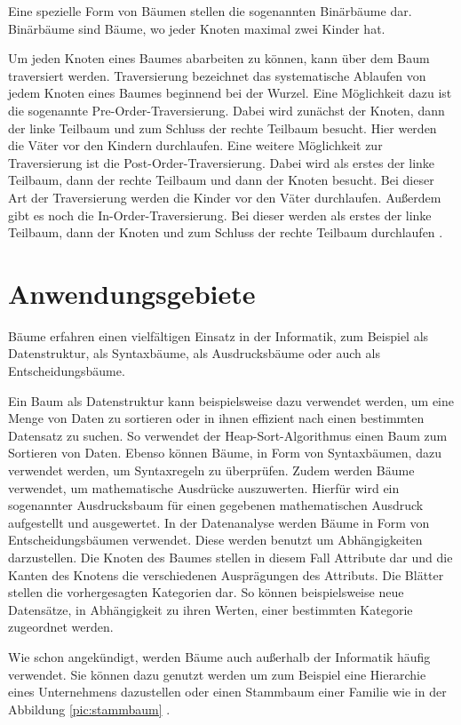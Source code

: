 Eine spezielle Form von Bäumen stellen die sogenannten Binärbäume dar. 
Binärbäume sind Bäume, wo jeder Knoten maximal zwei Kinder hat.

Um jeden Knoten eines Baumes abarbeiten zu können, kann über dem Baum 
traversiert werden. Traversierung bezeichnet das systematische Ablaufen 
von jedem Knoten eines Baumes beginnend bei der Wurzel. Eine Möglichkeit dazu ist die sogenannte
Pre-Order-Traversierung. Dabei wird zunächst der Knoten, dann der linke Teilbaum
und zum Schluss der rechte Teilbaum besucht. Hier werden die Väter vor den
Kindern durchlaufen. Eine weitere Möglichkeit zur Traversierung ist die 
Post-Order-Traversierung. Dabei wird als erstes der linke Teilbaum, dann der 
rechte Teilbaum und dann der Knoten besucht. Bei dieser Art der 
Traversierung werden die Kinder vor den Väter durchlaufen. Außerdem gibt es noch die In-Order-Traversierung.
Bei dieser werden als erstes der linke Teilbaum, dann der Knoten und zum Schluss der rechte Teilbaum durchlaufen \cite[S. 22]{q4}.

\section{Anwendungsgebiete}

Bäume erfahren einen vielfältigen Einsatz in der Informatik, zum Beispiel 
als Datenstruktur, als Syntaxbäume, als Ausdrucksbäume oder auch als 
Entscheidungsbäume.

Ein Baum als Datenstruktur kann beispielsweise dazu verwendet werden, 
um eine Menge von Daten zu sortieren oder in ihnen effizient nach einen 
bestimmten Datensatz zu suchen. So verwendet der Heap-Sort-Algorithmus 
einen Baum zum Sortieren von Daten. Ebenso können Bäume, in Form von Syntaxbäumen, dazu verwendet 
werden, um Syntaxregeln zu überprüfen. Zudem werden Bäume verwendet, um mathematische 
Ausdrücke auszuwerten. Hierfür wird ein sogenannter Ausdrucksbaum für einen 
gegebenen mathematischen Ausdruck aufgestellt und ausgewertet. In der 
Datenanalyse werden Bäume in Form von Entscheidungsbäumen verwendet. 
Diese werden benutzt um Abhängigkeiten darzustellen. Die Knoten des Baumes stellen in diesem Fall Attribute dar und die Kanten des Knotens
die verschiedenen Ausprägungen des Attributs. Die Blätter stellen die vorhergesagten Kategorien dar. So können beispielsweise neue 
Datensätze, in Abhängigkeit zu ihren Werten, einer bestimmten Kategorie 
zugeordnet werden.

Wie schon angekündigt, werden Bäume auch außerhalb der Informatik häufig verwendet. Sie können 
dazu genutzt werden um zum Beispiel eine Hierarchie eines Unternehmens
dazustellen oder einen Stammbaum einer 
Familie wie in der Abbildung \ref{pic:stammbaum} \cite[S. 2]{q4}.

